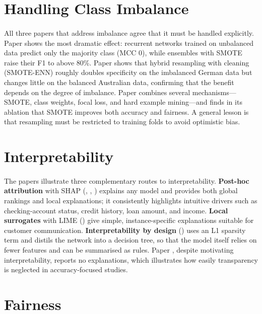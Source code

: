 \documentclass[12pt,a4paper,final]{extreport}
\begin{document}
\section{Handling Class Imbalance}

\paragraph{} All three papers that address imbalance agree that it must be handled explicitly. Paper \cite{p2} shows the most dramatic effect: recurrent networks trained on unbalanced data predict only the majority class (MCC 0), while ensembles with SMOTE raise their F1 to above 80\%. Paper \cite{p3} shows that hybrid resampling with cleaning (SMOTE-ENN) roughly doubles specificity on the imbalanced German data but changes little on the balanced Australian data, confirming that the benefit depends on the degree of imbalance. Paper \cite{p1} combines several mechanisms---SMOTE, class weights, focal loss, and hard example mining---and finds in its ablation that SMOTE improves both accuracy and fairness. A general lesson is that resampling must be restricted to training folds to avoid optimistic bias.

\section{Interpretability}

\paragraph{} The papers illustrate three complementary routes to interpretability. \textbf{Post-hoc attribution} with SHAP (\cite{p1}, \cite{p3}, \cite{p4}) explains any model and provides both global rankings and local explanations; it consistently highlights intuitive drivers such as checking-account status, credit history, loan amount, and income. \textbf{Local surrogates} with LIME (\cite{p4}) give simple, instance-specific explanations suitable for customer communication. \textbf{Interpretability by design} (\cite{p1}) uses an L1 sparsity term and distils the network into a decision tree, so that the model itself relies on fewer features and can be summarised as rules. Paper \cite{p2}, despite motivating interpretability, reports no explanations, which illustrates how easily transparency is neglected in accuracy-focused studies.

\section{Fairness}
\end{document}
